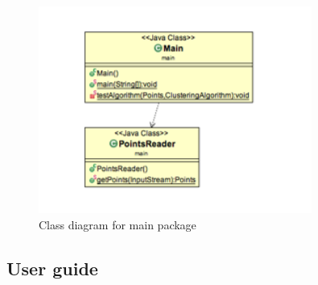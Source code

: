 \documentclass[12pt, a4paper, notitlepage, oneside]{article}
\begin{document}
\begin{itemize}
	\begin{figure}[!ht]
 	\centering
	\includegraphics[width=0.8\textwidth]{images/main_package.png}
 	\caption[]
	{Class diagram for main package}
	\end{figure}


\end{itemize}


\subsection{User guide}







\end{document}
